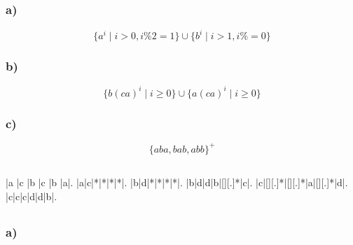 \documentclass{article}
\begin{document}
   \subsection{} 
   
   \subsubsection{a)}
   
   \begin{equation*}
      \{a^i \mid i > 0, i \% 2 = 1\} \cup \{b^i \mid i > 1, i \% = 0\}
   \end{equation*}

   \subsubsection{b)}

   \begin{equation*}
      \{b(ca)^i \mid i \ge 0\} \cup \{a(ca)^i \mid i \ge 0\}
   \end{equation*}

   \subsubsection{c)}

   \begin{equation*}
      \{aba, bab, abb\}^+
   \end{equation*}

   \subsection{} 
   
   \def\PuzzleSolutionContent#1{\makebox(1,1){\itshape{#1}}}
   \renewcommand{\PuzzleLineThickness}{1pt}
   \PuzzleSolution
   \begin{Puzzle}{6}{6}
      |a |c |b |c |b |a|.
      |a|c|*|*|*|*|.
      |b|d|*|*|*|*|.
      |b|d|d|b|[][.]*|c|.
      |c|[][.]*|[][.]*|a|[][.]*|d|.
      |c|c|c|d|d|b|.
   \end{Puzzle}

   \subsection{} 
   
   \subsubsection{a)}
      
\end{document}
